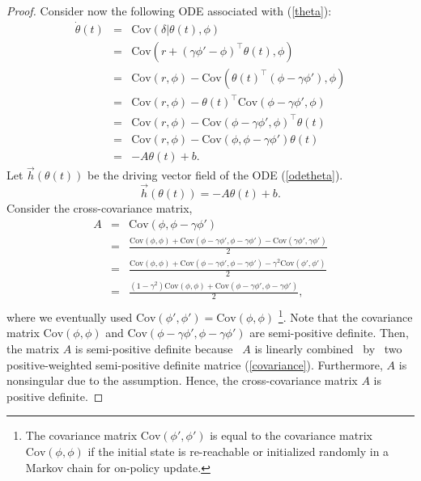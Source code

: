 \begin{proof}
 Consider now the following ODE associated with (\ref{theta}):
\begin{equation}
\begin{array}{ccl}
 \dot{\theta}(t)&=&\mathrm{Cov}(\delta|\theta(t),\phi)\\
&=&\mathrm{Cov}(r+(\gamma\phi'-\phi)^{\top}\theta(t),\phi)\\
&=&\mathrm{Cov}(r,\phi)-\mathrm{Cov}(\theta(t)^{\top}(\phi-\gamma\phi'),\phi)\\
&=&\mathrm{Cov}(r,\phi)-\theta(t)^{\top}\mathrm{Cov}(\phi-\gamma\phi',\phi)\\
&=&\mathrm{Cov}(r,\phi)-\mathrm{Cov}(\phi-\gamma\phi',\phi)^{\top}\theta(t)\\
&=&\mathrm{Cov}(r,\phi)-\mathrm{Cov}(\phi,\phi-\gamma\phi')\theta(t)\\
&=&-A\theta(t)+b.
\end{array}
\label{odetheta}
\end{equation}
 Let $\vec{h}(\theta(t))$ be the driving vector field of the ODE
 (\ref{odetheta}).
\begin{equation*}
 \vec{h}(\theta(t))=-A\theta(t)+b.
\end{equation*}
 Consider the cross-covariance matrix,
\begin{equation}
\begin{array}{ccl}
 A &=& \mathrm{Cov}(\phi,\phi-\gamma\phi')\\
  &=&\frac{\mathrm{Cov}(\phi,\phi)+\mathrm{Cov}(\phi-\gamma\phi',\phi-\gamma\phi')-\mathrm{Cov}(\gamma\phi',\gamma\phi')}{2}\\
  &=&\frac{\mathrm{Cov}(\phi,\phi)+\mathrm{Cov}(\phi-\gamma\phi',\phi-\gamma\phi')-\gamma^2\mathrm{Cov}(\phi',\phi')}{2}\\
  &=&\frac{(1-\gamma^2)\mathrm{Cov}(\phi,\phi)+\mathrm{Cov}(\phi-\gamma\phi',\phi-\gamma\phi')}{2},\\
\end{array}
\label{covariance}
\end{equation}
 where we eventually used $\mathrm{Cov}(\phi',\phi')=\mathrm{Cov}(\phi,\phi)$
\footnote{The covariance matrix $\mathrm{Cov}(\phi',\phi')$ is equal to
 the covariance matrix $\mathrm{Cov}(\phi,\phi)$ if the initial state is re-reachable or
 initialized randomly in a Markov chain for on-policy update.}.
 Note that the covariance matrix $\mathrm{Cov}(\phi,\phi)$ and
$\mathrm{Cov}(\phi-\gamma\phi',\phi-\gamma\phi')$ are semi-positive
 definite. Then, the matrix $A$ is semi-positive definite because  $A$ is
 linearly combined  by  two positive-weighted semi-positive definite matrice
 (\ref{covariance}).
 Furthermore, $A$ is nonsingular due to the assumption.
 Hence, the cross-covariance matrix $A$ is positive definite.


\end{proof}
